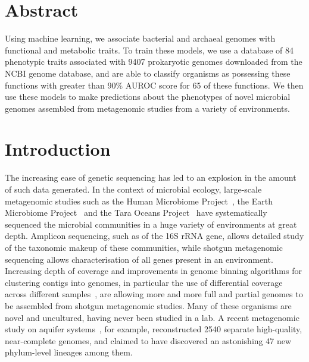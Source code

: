 \documentclass[10pt,letterpaper]{article}
\begin{document}
\section*{Abstract}
Using machine learning, we associate bacterial and archaeal genomes with functional and metabolic traits. To train these models, we use a database of 84 phenotypic traits associated with 9407 prokaryotic genomes downloaded from the NCBI genome database, and are able to classify organisms as possessing these functions with greater than 90\% AUROC score for 65 of these functions. We then use these models to make predictions about the phenotypes of novel microbial genomes assembled from metagenomic studies from a variety of environments.



\linenumbers

\section*{Introduction}
The increasing ease of genetic sequencing has led to an explosion in the amount of such data generated. In the context of microbial ecology, large-scale metagenomic studies such as the Human Microbiome Project~\cite{Huttenhower2012}, the Earth Microbiome Project~\cite{Gilbert2014} and the Tara Oceans Project~\cite{Zhang2015} have systematically sequenced the microbial communities in a huge variety of environments at great depth. Amplicon sequencing, such as of the 16S rRNA gene, allows detailed study of the taxonomic makeup of these communities, while shotgun metagenomic sequencing allows characterisation of all genes present in an environment. Increasing depth of coverage and improvements in genome binning algorithms for clustering contigs into genomes, in particular the use of differential coverage across different samples~\cite{Alneberg2014, Eren2015}, are allowing more and more full and partial genomes to be assembled from shotgun metagenomic studies. Many of these organisms are novel and uncultured, having never been studied in a lab. A recent metagenomic study on aquifer systems~\cite{Anantharaman2016}, for example, reconstructed 2540 separate high-quality, near-complete genomes, and claimed to have discovered an astonishing 47 new phylum-level lineages among them.
\end{document}
